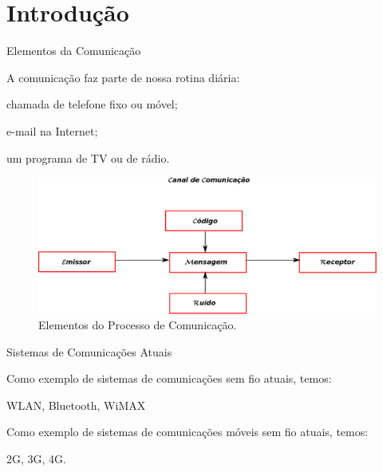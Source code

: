 \section{Introdução}\label{sec:intro}
\AtBeginSec

\begin{frame}{Elementos da Comunicação}
\begin{bigitem}
 \item A comunicação faz parte de nossa rotina diária:
 \begin{bigitem}
  \item chamada de telefone fixo ou móvel;
  \item e-mail na Internet;
  \item um programa de TV ou de rádio.
 \end{bigitem}
 \begin{figure}[!htb]
    \centering
    \includegraphics[width=0.50\linewidth]{../Imagens/elem_com.eps}
    \caption{Elementos do Processo de Comunicação.}\label{fig:elem_com}
   \end{figure}
\end{bigitem}
\end{frame}

\begin{frame}{Sistemas de Comunicações Atuais}
 \begin{bigitem}
  \item Como exemplo de sistemas de comunicações sem fio atuais, temos:
  \begin{bigitem}
    \item WLAN, Bluetooth, WiMAX
 \end{bigitem}
 \item Como exemplo de sistemas de comunicações móveis sem fio atuais, temos:
  \begin{bigitem}
   \item 2G, 3G, 4G.
 \end{bigitem}
 \end{bigitem}  
\end{frame}

